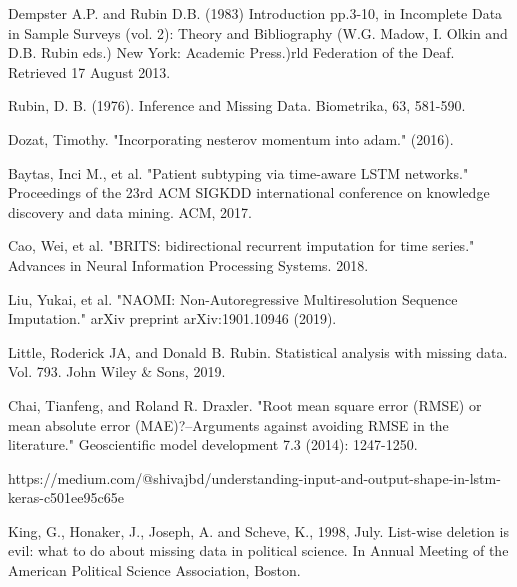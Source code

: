 \documentclass[11pt]{report}           %
\begin{document}
\appendix
%
%



\medskip



\begin{thebibliography}{80}



Dempster A.P. and Rubin D.B. (1983) Introduction pp.3-10, in Incomplete Data in Sample Surveys (vol. 2): Theory and Bibliography (W.G. Madow, I. Olkin and D.B. Rubin eds.) New York: Academic Press.)rld Federation of the Deaf. Retrieved 17 August 2013.
 
 Rubin, D. B. (1976). Inference and Missing Data. Biometrika, 63, 581-590. 

  Dozat, Timothy. "Incorporating nesterov momentum into adam." (2016).
 
 Baytas, Inci M., et al. "Patient subtyping via time-aware LSTM networks." Proceedings of the 23rd ACM SIGKDD international conference on knowledge discovery and data mining. ACM, 2017.
 
 Cao, Wei, et al. "BRITS: bidirectional recurrent imputation for time series." Advances in Neural Information Processing Systems. 2018.
 
 Liu, Yukai, et al. "NAOMI: Non-Autoregressive Multiresolution Sequence Imputation." arXiv preprint arXiv:1901.10946 (2019).
 
 Little, Roderick JA, and Donald B. Rubin. Statistical analysis with missing data. Vol. 793. John Wiley & Sons, 2019.
 
 Chai, Tianfeng, and Roland R. Draxler. "Root mean square error (RMSE) or mean absolute error (MAE)?–Arguments against avoiding RMSE in the literature." Geoscientific model development 7.3 (2014): 1247-1250.
 
 https://medium.com/@shivajbd/understanding-input-and-output-shape-in-lstm-keras-c501ee95c65e
 
 King, G., Honaker, J., Joseph, A. and Scheve, K., 1998, July. List-wise deletion is evil: what to do about missing data in political science. In Annual Meeting of the American Political Science Association, Boston.
 

\end{thebibliography}
\end{document}
